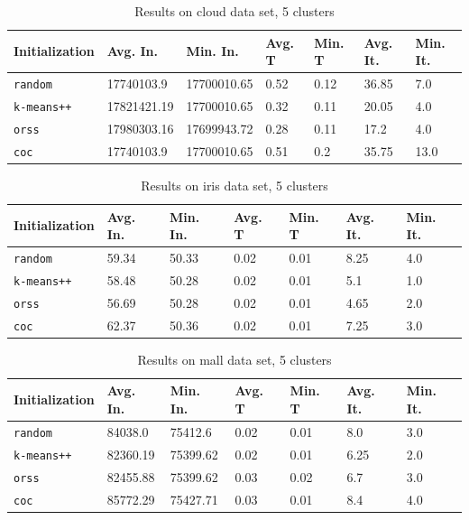 \documentclass[12pt]{article}
\begin{document}
		\begin{table}[p]
			\begin{center}
				\begin{tabular}{|l|l|l|l|l|l|l|}
					\hline
					Initialization & Avg. In. & Min. In. & Avg. T & Min. T & Avg. It. & Min. It.\\\hline
					\texttt{random} & 17740103.9 & 17700010.65 & 0.52 & 0.12 & 36.85 & 7.0\\\hline
					\texttt{k-means++} & 17821421.19 & 17700010.65 & 0.32 & 0.11 & 20.05 & 4.0\\\hline
					\texttt{orss} & 17980303.16 & 17699943.72 & 0.28 & 0.11 & 17.2 & 4.0\\\hline
					\texttt{coc} & 17740103.9 & 17700010.65 & 0.51 & 0.2 & 35.75 & 13.0\\\hline
				\end{tabular}
				\caption{Results on cloud data set, 5 clusters}
				\label{tbl:cloud5}
			\end{center}
		\end{table}

		\begin{table}[p]
			\begin{center}
				\begin{tabular}{|l|l|l|l|l|l|l|}
					\hline
					Initialization & Avg. In. & Min. In. & Avg. T & Min. T & Avg. It. & Min. It.\\\hline
					\texttt{random} & 59.34 & 50.33 & 0.02 & 0.01 & 8.25 & 4.0\\\hline
					\texttt{k-means++} & 58.48 & 50.28 & 0.02 & 0.01 & 5.1 & 1.0\\\hline
					\texttt{orss} & 56.69 & 50.28 & 0.02 & 0.01 & 4.65 & 2.0\\\hline
					\texttt{coc} & 62.37 & 50.36 & 0.02 & 0.01 & 7.25 & 3.0\\\hline
				\end{tabular}
				\caption{Results on iris data set, 5 clusters}
				\label{tbl:iris5}
			\end{center}
		\end{table}

		\begin{table}[p]
			\begin{center}
				\begin{tabular}{|l|l|l|l|l|l|l|}
					\hline
					Initialization & Avg. In. & Min. In. & Avg. T & Min. T & Avg. It. & Min. It.\\\hline
					\texttt{random} & 84038.0 & 75412.6 & 0.02 & 0.01 & 8.0 & 3.0\\\hline
					\texttt{k-means++} & 82360.19 & 75399.62 & 0.02 & 0.01 & 6.25 & 2.0\\\hline
					\texttt{orss} & 82455.88 & 75399.62 & 0.03 & 0.02 & 6.7 & 3.0\\\hline
					\texttt{coc} & 85772.29 & 75427.71 & 0.03 & 0.01 & 8.4 & 4.0\\\hline
				\end{tabular}
				\caption{Results on mall data set, 5 clusters}
				\label{tbl:mall5}
			\end{center}
		\end{table}
\end{document}
